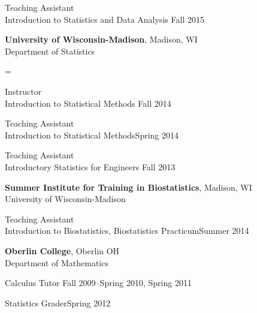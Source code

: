 \documentclass[letterpaper, 11pt]{article}
\newenvironment{absolutelynopagebreak}
  {\par\nobreak\vfil\penalty0\vfilneg
   \vtop\bgroup}
  {\par\xdef\tpd{\the\prevdepth}\egroup
   \prevdepth=\tpd}
\begin{document}
\hspace{15pt}Teaching Assistant\\
\hspace{15pt}%
Introduction to Statistics and Data Analysis \hfill Fall 2015

\vspace{6pt}
\begin{absolutelynopagebreak}
{\bf University of Wisconsin-Madison}, Madison, WI\\
Department of Statistics
\end{absolutelynopagebreak}

\hspace{15pt}Instructor\\
\hspace{15pt}%
Introduction to Statistical Methods \hfill Fall 2014

\hspace{15pt}Teaching Assistant\\
\hspace{15pt}%
Introduction to Statistical Methods\hfill Spring 2014

\hspace{15pt}Teaching Assistant\\
\hspace{15pt}%
Introductory Statistics for Engineers \hfill Fall 2013

\vspace{6pt}
{\bf Summer Institute for Training in Biostatistics}, Madison, WI\\
University of Wisconsin-Madison

\hspace{15pt}Teaching Assistant\\
\hspace{15pt}Introduction to Biostatistics, Biostatistics Practicum\hfill Summer 2014

\vspace{6pt}
{\bf Oberlin College}, Oberlin OH\\
Department of Mathematics

\hspace{15pt}Calculus Tutor \hfill Fall 2009--Spring 2010, Spring 2011

\hspace{15pt}Statistics Grader\hfill Spring 2012
\end{document}
